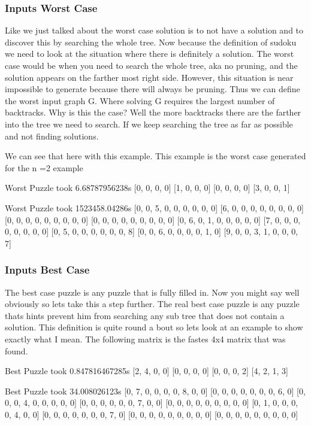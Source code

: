 \documentclass{sig-alternate}
\begin{document}
\subsubsection{Inputs Worst Case}
Like we just talked about the worst case solution is to not have a solution and to discover this by searching the whole tree. Now because the definition of sudoku we need to look at the situation where there is definitely a solution. The worst case would be when you need to search the whole tree, aka no pruning, and the solution appears on the farther most right side. However, this situation is near impossible to generate because there will always be pruning. 
	Thus we can define the worst input graph G. Where solving G requires the largest number of backtracks. Why is this the case? Well the more backtracks there are the farther into the tree we need to search. If we keep searching the tree as far as possible and not finding solutions. 
    
    We can see that here with this example. This example is the worst case generated for the n =2 example 
    
Worst Puzzle took 6.68787956238s
[0, 0, 0, 0]
[1, 0, 0, 0]
[0, 0, 0, 0]
[3, 0, 0, 1]

Worst Puzzle took 1523458.04286s
[0, 0, 5, 0, 0, 0, 0, 0, 0]
[6, 0, 0, 0, 0, 0, 0, 0, 0]
[0, 0, 0, 0, 0, 0, 0, 0, 0]
[0, 0, 0, 0, 0, 0, 0, 0, 0]
[0, 6, 0, 1, 0, 0, 0, 0, 0]
[7, 0, 0, 0, 0, 0, 0, 0, 0]
[0, 5, 0, 0, 0, 0, 0, 0, 8]
[0, 0, 6, 0, 0, 0, 0, 1, 0]
[9, 0, 0, 3, 1, 0, 0, 0, 7]

\subsubsection{Inputs Best Case}

The best case puzzle is any puzzle that is fully filled in. Now you might say well obviously so lets take this a step further. The real best case puzzle is any puzzle thats hints prevent him from searching any sub tree that does not contain a solution. This definition is quite round a bout so lets look at an example to show exactly what I mean. The following matrix is the fastes 4x4 matrix that was found. 

Best Puzzle took 0.847816467285s
[2, 4, 0, 0]
[0, 0, 0, 0]
[0, 0, 0, 2]
[4, 2, 1, 3]

Best Puzzle took 34.008026123s
[0, 7, 0, 0, 0, 0, 8, 0, 0]
[0, 0, 0, 0, 0, 0, 0, 6, 0]
[0, 0, 0, 4, 0, 0, 0, 0, 0]
[0, 0, 0, 0, 0, 0, 7, 0, 0]
[0, 0, 0, 0, 0, 0, 0, 0, 0]
[0, 1, 0, 0, 0, 0, 4, 0, 0]
[0, 0, 0, 0, 0, 0, 0, 7, 0]
[0, 0, 0, 0, 0, 0, 0, 0, 0]
[0, 0, 0, 0, 0, 0, 0, 0, 0]
\end{document}
